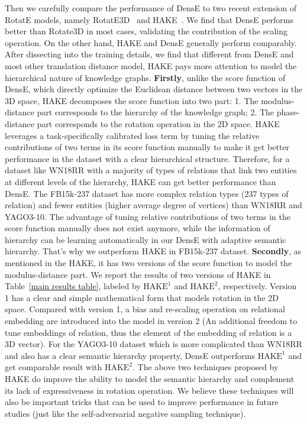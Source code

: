\documentclass[11pt]{article}
\begin{document}
Then we carefully compare the performance of DensE to two recent extension of RotatE models, namely RotatE3D~\cite{gao2020rotate3d} and HAKE~\cite{zhang2020learning}. We find that DensE performs better than Rotate3D in most cases, validating the contribution of the scaling operation. 
On the other hand, HAKE and DensE generally perform comparably. After dissecting into the training details, we find that different from DensE and most other translation distance model, HAKE pays more attention to model the hierarchical nature of knowledge graphs. \textbf{Firstly}, unlike the score function of DensE, which directly optimize the Euclidean distance between two vectors in the 3D space, HAKE decomposes the score function into two part: 1. The modulus-distance part corresponds to the hierarchy of the knowledge graph; 2. The phase-distance part corresponds to the rotation operation in the 2D space. HAKE leverages a task-specifically calibrated loss term by tuning the relative contributions of two terms in its score function manually to make it get better performance in the dataset with a clear hierarchical structure. Therefore, for a dataset like WN18RR with a majority of types of relations that link two entities at different levels of the hierarchy, HAKE can get better performance than DensE. The FB15k-237 dataset has more complex relation types (237 types of relation) and fewer entities (higher average degree of vertices) than WN18RR and YAGO3-10. The advantage of tuning relative contributions of two terms in the score function manually does not exist anymore, while the information of hierarchy can be learning automatically in our DensE with adaptive semantic hierarchy. That’s why we outperform HAKE in FB15k-237 dataset. \textbf{Secondly}, as mentioned in the HAKE, it has two versions of the score function to model the modulus-distance part. We report the results of two versions of HAKE in Table~\ref{main results table}, labeled by \(\text{HAKE}^{1}\) and \(\text{HAKE}^{2}\), respectively. Version 1 has a clear and simple mathematical form that models rotation in the 2D space. Compared with version 1, a bias and re-scaling operation on relational embedding are introduced into the model in version 2 (An additional freedom to tune embeddings of relation, thus the element of the embedding of relation is a 3D vector). For the YAGO3-10 dataset which is more complicated than WN18RR and also has a clear semantic hierarchy property, DensE outperforms \(\text{HAKE}^{1}\) and get comparable result with \(\text{HAKE}^{2}\). The above two techniques proposed by HAKE do improve the ability to model the semantic hierarchy and complement its lack of expressiveness in rotation operation. We believe these techniques will also be important tricks that can be used to improve performance in future studies (just like the self-adversarial negative sampling technique).
\end{document}

